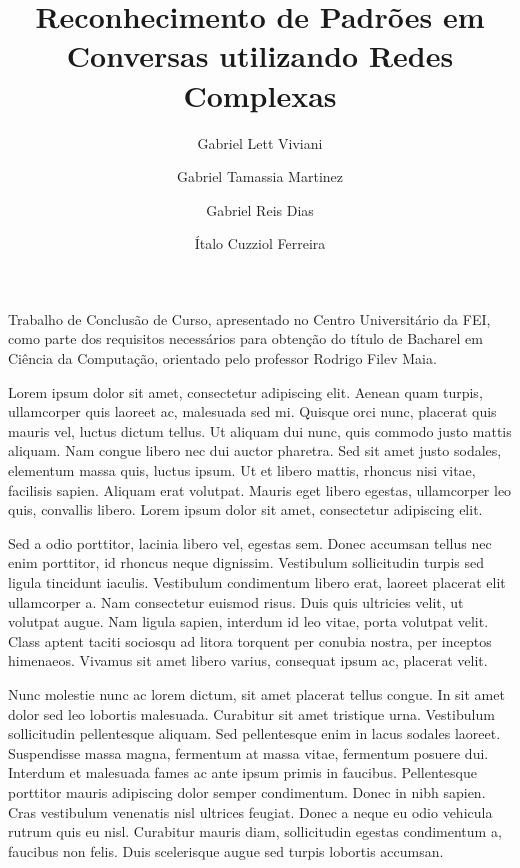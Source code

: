 \documentclass[xindy,rascunho]{fei}
\author{Gabriel Lett Viviani \and Gabriel Tamassia Martinez \and Gabriel Reis Dias \and Ítalo Cuzziol Ferreira}
\title{Reconhecimento de Padrões em Conversas utilizando Redes Complexas}
\begin{document}
\maketitle

\begin{folhaderosto}
Trabalho de Conclusão de Curso, apresentado no Centro Universitário da FEI, como parte dos requisitos necessários para obtenção do título de Bacharel em Ciência da Computação, orientado pelo professor Rodrigo Filev Maia.
\end{folhaderosto}

{}
\begin{agradecimentos}
Lorem ipsum dolor sit amet, consectetur adipiscing elit. Aenean quam turpis, ullamcorper quis laoreet ac, malesuada sed mi. Quisque orci nunc, placerat quis mauris vel, luctus dictum tellus. Ut aliquam dui nunc, quis commodo justo mattis aliquam. Nam congue libero nec dui auctor pharetra. Sed sit amet justo sodales, elementum massa quis, luctus ipsum. Ut et libero mattis, rhoncus nisi vitae, facilisis sapien. Aliquam erat volutpat. Mauris eget libero egestas, ullamcorper leo quis, convallis libero. Lorem ipsum dolor sit amet, consectetur adipiscing elit.

Sed a odio porttitor, lacinia libero vel, egestas sem. Donec accumsan tellus nec enim porttitor, id rhoncus neque dignissim. Vestibulum sollicitudin turpis sed ligula tincidunt iaculis. Vestibulum condimentum libero erat, laoreet placerat elit ullamcorper a. Nam consectetur euismod risus. Duis quis ultricies velit, ut volutpat augue. Nam ligula sapien, interdum id leo vitae, porta volutpat velit. Class aptent taciti sociosqu ad litora torquent per conubia nostra, per inceptos himenaeos. Vivamus sit amet libero varius, consequat ipsum ac, placerat velit.

Nunc molestie nunc ac lorem dictum, sit amet placerat tellus congue. In sit amet dolor sed leo lobortis malesuada. Curabitur sit amet tristique urna. Vestibulum sollicitudin pellentesque aliquam. Sed pellentesque enim in lacus sodales laoreet. Suspendisse massa magna, fermentum at massa vitae, fermentum posuere dui. Interdum et malesuada fames ac ante ipsum primis in faucibus. Pellentesque porttitor mauris adipiscing dolor semper condimentum. Donec in nibh sapien. Cras vestibulum venenatis nisl ultrices feugiat. Donec a neque eu odio vehicula rutrum quis eu nisl. Curabitur mauris diam, sollicitudin egestas condimentum a, faucibus non felis. Duis scelerisque augue sed turpis lobortis accumsan.


\end{agradecimentos}
\end{document}
